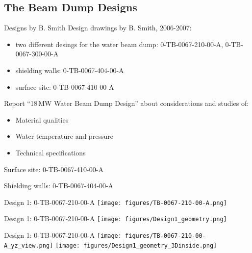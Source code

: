 \documentclass[xcolor={dvipsnames}]{beamer}
\begin{document}
\subsection{The Beam Dump Designs}
\begin{frame}{Designs by B. Smith}
Design drawings by B. Smith, 2006-2007:
\begin{itemize}
 \item two different desings for the water beam dump: 0-TB-0067-210-00-A, 0-TB-0067-300-00-A
 \item shielding walls: 0-TB-0067-404-00-A
 \item surface site: 0-TB-0067-410-00-A
\end{itemize}
Report ``18\,MW Water Beam Dump Design'' about considerations and studies of:
\begin{itemize}
 \item Material qualities
 \item Water temperature and pressure
 \item Technical specifications
\end{itemize}
\end{frame}

\begin{frame}{Surface site: 0-TB-0067-410-00-A}
\centering
{}
\end{frame}
\begin{frame}{Shielding walls: 0-TB-0067-404-00-A}
\centering
{}
\end{frame}

\begin{frame}{Design 1: 0-TB-0067-210-00-A}
\centering
 \texttt{[image: figures/TB-0067-210-00-A.png]}
\end{frame}
\begin{frame}{Design 1: 0-TB-0067-210-00-A}
\centering
 \texttt{[image: figures/Design1\_geometry.png]}
\end{frame}
\begin{frame}{Design 1: 0-TB-0067-210-00-A}
\centering
 \texttt{[image: figures/TB-0067-210-00-A\_yz\_view.png]}
 \hfill
 \texttt{[image: figures/Design1\_geometry\_3Dinside.png]}
\end{frame}
\end{document}
